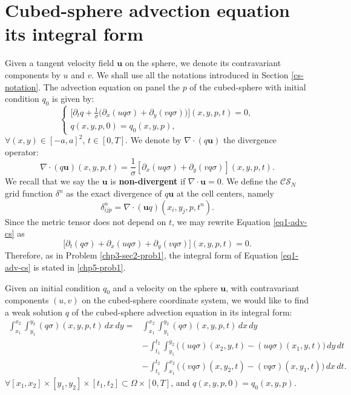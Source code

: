 \section{Cubed-sphere advection equation its integral form}
\label{chp-cs-adv}
Given a tangent velocity field $\boldsymbol{u}$ on the sphere, we denote its
contravariant components by ${u}$ and ${v}$.
We shall use all the notations introduced in Section \ref{cs-notation}.
The advection equation on panel the $p$ of the cubed-sphere with initial condition $q_0$ is given by:
\begin{equation}
	\begin{cases}
	\label{eq1-adv-cs}
	\bigg[{\partial}_t{q}+
	\frac{1}{\sigma}\bigg(
	{\partial}_x{({u} q \sigma)}+
	{\partial}_y{({v} q \sigma)}
	\bigg)\bigg](x,y,p,t)
	= 0,\\
	q(x,y,p,0) = q_0(x,y,p),
	\end{cases}
\end{equation}
$\forall (x,y) \in [-a,a]^2$, $t\in[0,T]$.
We denote by $\nabla \cdot (q\boldsymbol{u})$ the divergence operator:
\begin{equation}
	\label{advcs:eqdiv}
	\nabla \cdot (q\boldsymbol{u})(x, y, p, t) =  \frac{1}{\sigma}
	[{\partial_x (uq\sigma)} + {\partial_y (vq\sigma)}](x, y, p, t).
\end{equation}
We recall that we say the $\boldsymbol{u}$ is \textbf{non-divergent} if $\nabla \cdot \boldsymbol{u}=0$.
We define the $\mathcal{CS}_N$ grid function $\delta^n$ as
the exact divergence of $q\boldsymbol{u}$ at the cell centers, namely
\begin{equation}
	\label{cs-discrete-div}
	\delta^n_{ijp} = \nabla \cdot (\boldsymbol{u}q)(x_i,y_j,p,t^n).
\end{equation}
Since the metric tensor does not depend on $t$, we may rewrite Equation \eqref{eq1-adv-cs} as
\begin{equation}
	\label{eq2-adv-cs}
	\bigg[{\partial}_t{(q \sigma)}+
	{\partial}_x{({u}q \sigma)}+
	{\partial}_y{({v}q \sigma)}
	\bigg](x,y,p,t)
	= 0.
\end{equation}
Therefore, as in Problem \eqref{chp3-sec2-prob1}, the integral form of Equation \eqref{eq1-adv-cs}
is stated in \eqref{chp5-prob1}.
\begin{prob}
	\label{chp5-prob1}
	Given an initial condition ${q}_0$ and
	a velocity on the sphere $\boldsymbol{u}$, with contravariant components $(u,v)$ on the cubed-sphere coordinate system,
	we would like to find a weak solution ${q}$
	of the cubed-sphere advection equation in its integral form:
	\begin{align*}
		\int_{x_1}^{x_2} \int_{y_1}^{y_2}
		{(q\sigma)}(x, y, p, t) \,dx \,dy = &\int_{x_1}^{x_2} \int_{y_1}^{y_2}
		{(q\sigma)}(x, y, p, t) \,dx \,dy \\ \nonumber
		&-\int_{t_1}^{t_2} \int_{y_1}^{y_2} \bigg({(uq\sigma)}(x_2, y, t)
		-{(uq\sigma)}(x_1, y, t) \bigg) \,dy \,dt\\ \nonumber
		&-\int_{t_1}^{t_2} \int_{x_1}^{x_2} \bigg({(vq\sigma)}(x, y_2, t)
		-{(vq\sigma)}(x, y_1, t) \bigg) \,dx \,dt.
	\end{align*}
	$\forall [x_1, x_2]\times [y_1, y_2] \times[t_1, t_2] \subset \Omega \times[0,T]$, and
	$q(x,y,p,0)=q_0(x,y,p)$.
\end{prob}
